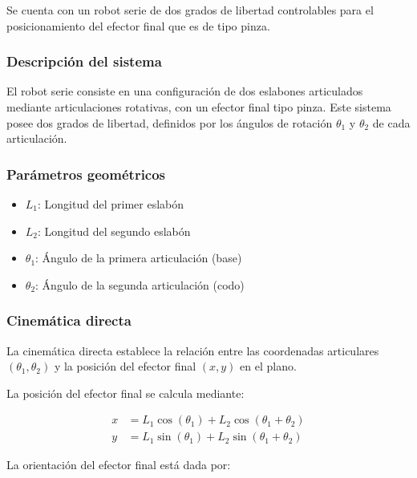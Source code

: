 Se cuenta con un robot serie de dos grados de libertad controlables para el posicionamiento del efector final que es de tipo pinza.

\subsubsection{Descripción del sistema}
\label{sec:desc_brazo}

El robot serie consiste en una configuración de dos eslabones articulados mediante articulaciones rotativas, con un efector final tipo pinza. Este sistema posee dos grados de libertad, definidos por los ángulos de rotación $\theta_1$ y $\theta_2$ de cada articulación.

\subsubsection{Parámetros geométricos}
\label{sec:Param_brazo}

\begin{itemize}[label=$\bullet$]
    \item $L_1$: Longitud del primer eslabón
    \item $L_2$: Longitud del segundo eslabón
    \item $\theta_1$: Ángulo de la primera articulación (base)
    \item $\theta_2$: Ángulo de la segunda articulación (codo)
\end{itemize}

\subsubsection{Cinemática directa}

La cinemática directa establece la relación entre las coordenadas articulares $(\theta_1, \theta_2)$ y la posición del efector final $(x, y)$ en el plano.

La posición del efector final se calcula mediante:

\begin{align}
    x &= L_1 \cos(\theta_1) + L_2 \cos(\theta_1 + \theta_2) \label{eq:x_cin_dir}\\
    y &= L_1 \sin(\theta_1) + L_2 \sin(\theta_1 + \theta_2) \label{eq:y_cin_dir}
\end{align}

La orientación del efector final está dada por:

